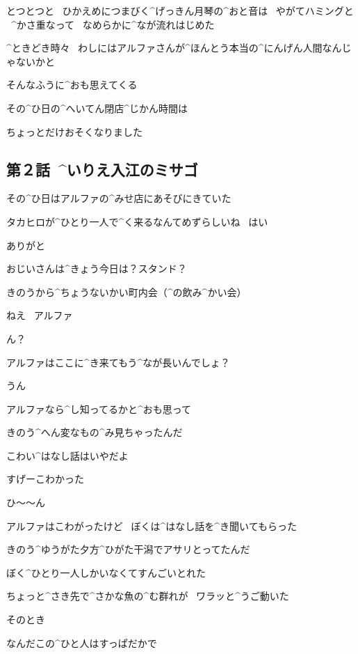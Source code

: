 \page[39]
\Ojisan とつとつと
\ ひかえめにつまびく^{げっきん}{月琴}の^{おと}{音}は
\ やがてハミングと
\ ^{かさ}{重}なって
\ なめらかに^{なが}{流}れはじめた

\page[40]
\Ojisan ^{ときどき}{時々}
\ わしにはアルファさんが^{ほんとう}{本当}の^{にんげん}{人間}なんじゃないかと

\Ojisan そんなふうに^{おも}{思}えてくる

\page[42]
\Alpha その^{ひ}{日}の^{へいてん}{閉店}^{じかん}{時間}は

\Alpha ちょっとだけおそくなりました


\subsection{第２話\ ^{いりえ}{入江}のミサゴ}

\page[44]
\Takahiro その^{ひ}{日}はアルファの^{みせ}{店}にあそびにきていた

\Alpha タカヒロが^{ひとり}{一人}で^{く}{来}るなんてめずらしいね
\ はい

\Takahiro ありがと

\Alpha おじいさんは^{きょう}{今日}は？スタンド？

\Takahiro きのうから^{ちょうないかい}{町内会}（^{の}{飲}み^{かい}{会}）

\Takahiro ねえ
\ アルファ

\Alpha ん？

\page[45]
\Takahiro アルファはここに^{き}{来}てもう^{なが}{長}いんでしょ？

\Alpha うん

\Takahiro アルファなら^{し}{知}ってるかと^{おも}{思}って

\Takahiro きのう^{へん}{変}なもの^{み}{見}ちゃったんだ

\Alpha こわい^{はなし}{話}はいやだよ

\Takahiro すげーこわかった

\Alpha ひ〜〜ん

\Takahiro アルファはこわがったけど
\ ぼくは^{はなし}{話}を^{き}{聞}いてもらった

\page[46]
\Takahiro きのう^{ゆうがた}{夕方}^{ひがた}{干潟}でアサリとってたんだ

\Takahiro ぼく^{ひとり}{一人}しかいなくてすんごいとれた

\Takahiro ちょっと^{さき}{先}で^{さかな}{魚}の^{む}{群}れが
\ ワラッと^{うご}{動}いた

\Takahiro そのとき

\page[49]
\Takahiro なんだこの^{ひと}{人}はすっぱだかで

